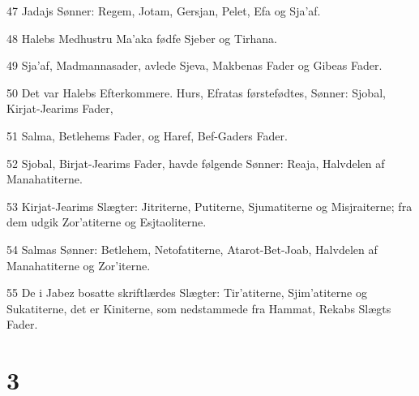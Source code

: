 \par 47 Jadajs Sønner: Regem, Jotam, Gersjan, Pelet, Efa og Sja'af.
\par 48 Halebs Medhustru Ma'aka fødfe Sjeber og Tirhana.
\par 49 Sja'af, Madmannasader, avlede Sjeva, Makbenas Fader og Gibeas Fader.
\par 50 Det var Halebs Efterkommere. Hurs, Efratas førstefødtes, Sønner: Sjobal, Kirjat-Jearims Fader,
\par 51 Salma, Betlehems Fader, og Haref, Bef-Gaders Fader.
\par 52 Sjobal, Birjat-Jearims Fader, havde følgende Sønner: Reaja, Halvdelen af Manahatiterne.
\par 53 Kirjat-Jearims Slægter: Jitriterne, Putiterne, Sjumatiterne og Misjraiterne; fra dem udgik Zor'atiterne og Esjtaoliterne.
\par 54 Salmas Sønner: Betlehem, Netofatiterne, Atarot-Bet-Joab, Halvdelen af Manahatiterne og Zor'iterne.
\par 55 De i Jabez bosatte skriftlærdes Slægter: Tir'atiterne, Sjim'atiterne og Sukatiterne, det er Kiniterne, som nedstammede fra Hammat, Rekabs Slægts Fader.

\chapter{3}


